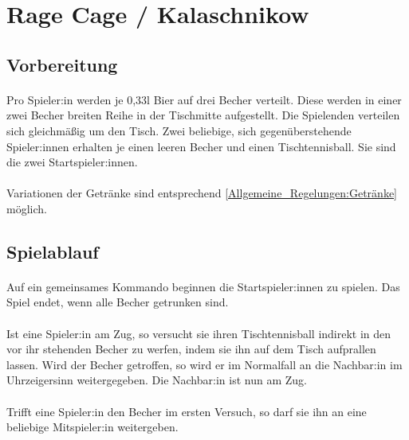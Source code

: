\section{Rage Cage / Kalaschnikow}
\subsection{Vorbereitung}
\paragraph{}
Pro Spieler:in werden je 0,33l Bier auf drei Becher verteilt.
Diese werden in einer zwei Becher breiten Reihe in der Tischmitte aufgestellt.
Die Spielenden verteilen sich gleichmäßig um den Tisch.
Zwei beliebige, sich gegenüberstehende Spieler:innen erhalten je einen leeren Becher und einen Tischtennisball.
Sie sind die zwei Startspieler:innen.

\paragraph{}
Variationen der Getränke sind entsprechend \ref{Allgemeine_Regelungen:Getränke} möglich.


\subsection{Spielablauf}
\paragraph{}
Auf ein gemeinsames Kommando beginnen die Startspieler:innen zu spielen.
Das Spiel endet, wenn alle Becher getrunken sind.

\paragraph{}
Ist eine Spieler:in am Zug, so versucht sie ihren Tischtennisball indirekt in den vor ihr stehenden Becher zu werfen, indem sie ihn auf dem Tisch aufprallen lassen.
Wird der Becher getroffen, so wird er im Normalfall an die Nachbar:in im Uhrzeigersinn weitergegeben.
Die Nachbar:in ist nun am Zug.

\paragraph{}
Trifft eine Spieler:in den Becher im ersten Versuch, so darf sie ihn an eine beliebige Mitspieler:in weitergeben.


